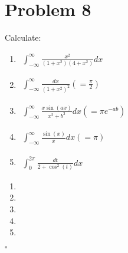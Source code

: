 \documentclass[11pt]{article}
\newenvironment{proof}{\noindent{\bf Proof.}}{\hfill $\square$\medskip}
\begin{document}
\newpage
\section{Problem 8}
Calculate:
\begin{enumerate}[label=\textbf{(\alph*)}]
    \item
          \begin{flushleft}
              $\begin{aligned}
                      \int_{-\infty}^{\infty}\frac{x^{2}}{(1+x^{2})(4+x^{2})}dx
                  \end{aligned}$
          \end{flushleft}
    \item
          \begin{flushleft}
              $\begin{aligned}
                      \int_{-\infty}^{\infty}\frac{dx}{(1+x^{2})^{2}}(=\frac{\pi}{2})
                  \end{aligned}$
          \end{flushleft}
    \item
          \begin{flushleft}
              $\begin{aligned}
                      \int_{-\infty}^{\infty}\frac{x\sin(ax)}{x^{2}+b^{2}}dx(=\pi e^{-ab})
                  \end{aligned}$
          \end{flushleft}
    \item
          \begin{flushleft}
              $\begin{aligned}
                      \int_{-\infty}^{\infty}\frac{\sin(x)}{x}dx(=\pi)
                  \end{aligned}$
          \end{flushleft}
    \item
          \begin{flushleft}
              $\begin{aligned}
                      \int_{0}^{2\pi}\frac{dt}{2+\cos^{2}(t)}dx
                  \end{aligned}$
          \end{flushleft}
\end{enumerate}

\begin{proof}
    \begin{enumerate}[label=\textbf{(\alph*)}]
        \item
        \item
        \item
        \item
        \item
    \end{enumerate}
\end{proof}
\end{document}
